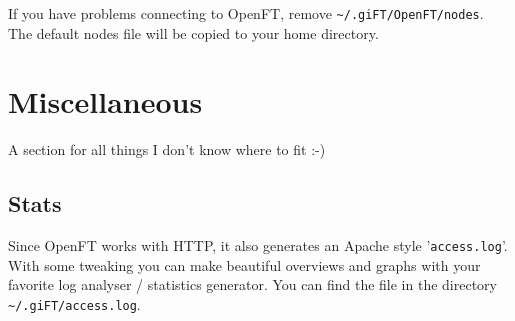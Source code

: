 \documentclass[10pt]{article}
\begin{document}
If you have problems connecting to OpenFT, remove
\texttt{\~{}/.giFT/OpenFT/nodes}. The default nodes file will be
copied to your home directory. 

\section{Miscellaneous}
A section for all things I don't know where to fit :-)

\subsection{Stats}
Since OpenFT works with HTTP, it also generates an Apache style
'\texttt{access.log}'.  With some tweaking you can make beautiful
overviews and graphs with your favorite log analyser / statistics
generator.  You can find the file in the directory
\texttt{\~{}/.giFT/access.log}.
\end{document}
